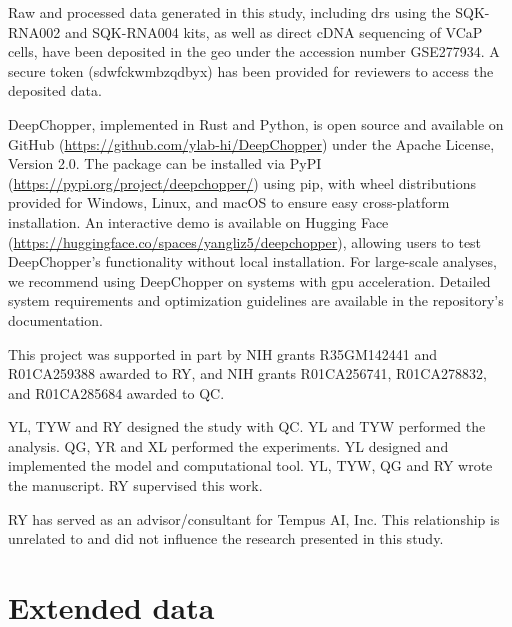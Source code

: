 \documentclass[pdflatex,sn-nature, lineno]{sn-jnl}%
\begin{document}

Raw and processed data generated in this study, including \gls{drs} using the SQK-RNA002 and SQK-RNA004 kits, as well as direct cDNA sequencing of VCaP cells, have been deposited in the \gls{geo} under the accession number GSE277934.
A secure token (sdwfckwmbzqdbyx) has been provided for reviewers to access the deposited data.


DeepChopper, implemented in Rust and Python, is open source and available on GitHub (\url{https://github.com/ylab-hi/DeepChopper}) under the Apache License, Version 2.0.
The package can be installed via PyPI (\url{https://pypi.org/project/deepchopper/}) using pip, with wheel distributions provided for Windows, Linux, and macOS to ensure easy cross-platform installation.
An interactive demo is available on Hugging Face (\url{https://huggingface.co/spaces/yangliz5/deepchopper}), allowing users to test DeepChopper's functionality without local installation.
For large-scale analyses, we recommend using DeepChopper on systems with \gls{gpu} acceleration. Detailed system requirements and optimization guidelines are available in the repository's documentation.


This project was supported in part by NIH grants R35GM142441 and R01CA259388 awarded to RY, and NIH grants R01CA256741, R01CA278832, and R01CA285684 awarded to QC.


YL, TYW and RY designed the study with QC. YL and TYW performed the analysis. QG, YR and XL performed the experiments. YL designed and implemented the model and computational tool. YL, TYW, QG and RY wrote the manuscript. RY supervised this work.


RY has served as an advisor/consultant for Tempus AI, Inc. This relationship is unrelated to and did not influence the research presented in this study.

\backmatter

\begin{appendices}
	\printglossaries
\end{appendices}


\newpage

\section{Extended data}
\end{document}
